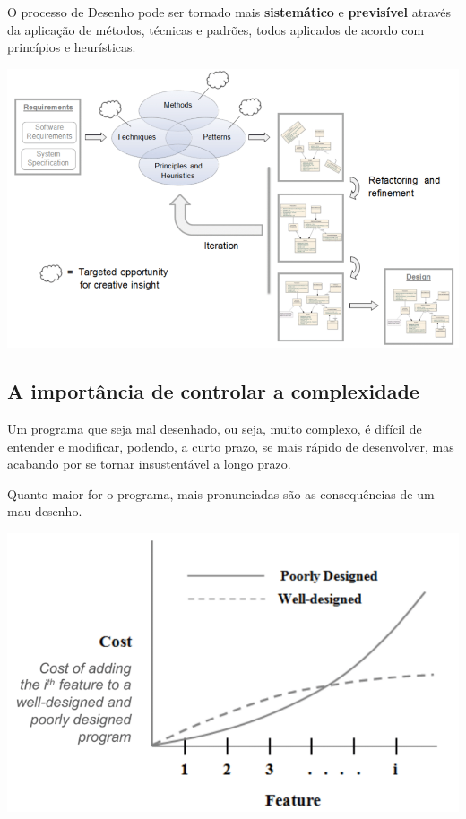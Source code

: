 \documentclass{article}
\begin{document}
\par
O processo de Desenho pode ser tornado mais \textbf{sistemático} e \textbf{previsível}
através da aplicação de métodos, técnicas e padrões, todos aplicados de acordo com
princípios e heurísticas.

\begin{center}
    \includegraphics[scale=0.4]{Images/2.png}
\end{center}

\pagebreak

\subsection{A importância de controlar a complexidade}

\par
Um programa que seja mal desenhado, ou seja, muito complexo, é \uline{difícil de entender
e modificar}, podendo, a curto prazo, se mais rápido de desenvolver, mas acabando por
se tornar \uline{insustentável a longo prazo}.

Quanto maior for o programa, mais pronunciadas são as consequências de um mau desenho.

\begin{center}
    \includegraphics[scale=0.3]{Images/3.png}
\end{center}
\end{document}
